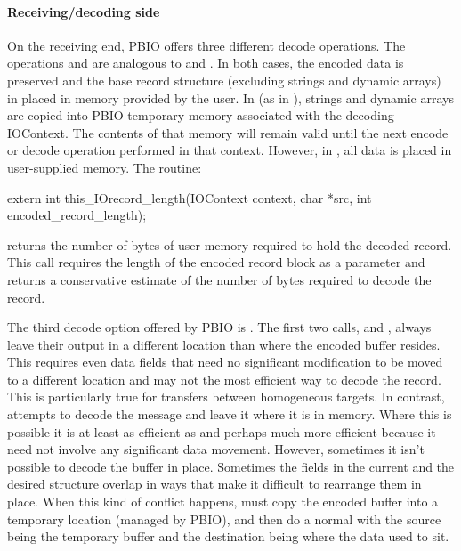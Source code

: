 \paragraph{Receiving/decoding side}
On the receiving end, PBIO offers three different decode operations.  The
operations  and 
are analogous to  and .
In both cases, the encoded data is preserved and the base record structure
(excluding strings and dynamic arrays) in placed in memory provided by the
user.  In  (as in ), strings and
dynamic arrays are copied into PBIO temporary memory associated with the
decoding IOContext.  The contents of that memory will remain valid until the
next encode or decode operation performed in that context.  However, in
, all data is placed in
user-supplied memory. 
The routine:
\begin{Code}
extern int
this_IOrecord_length(IOContext context, char *src, int encoded_record_length);
\end{Code}
returns the number of bytes of user memory required to hold the decoded record.
This call requires the length of the encoded record block as a parameter and
returns a conservative estimate of the number of bytes required to decode the
record.  

The third decode option offered by PBIO is
.  The first two calls,
 and ,
always leave 
their output in a different location than where the encoded buffer resides.
This requires even data fields that need no significant modification to be
moved to a different location and may not the most efficient way to decode the
record.  This is particularly true for transfers between homogeneous targets.
In contrast,  attempts to decode the
message and leave it where it is in memory.  Where this is possible it is at
least as efficient as  and perhaps much more
efficient because it need not involve any significant data movement.  However,
sometimes it isn't possible to decode the buffer in place.  Sometimes the
fields in the current and the desired structure overlap in ways that make it
difficult to rearrange them in place.  When this kind of conflict happens,
 must copy the encoded buffer into a
temporary location (managed by PBIO), and then do a normal
 with the source being the temporary buffer and
the 
destination being where the data used to sit.

